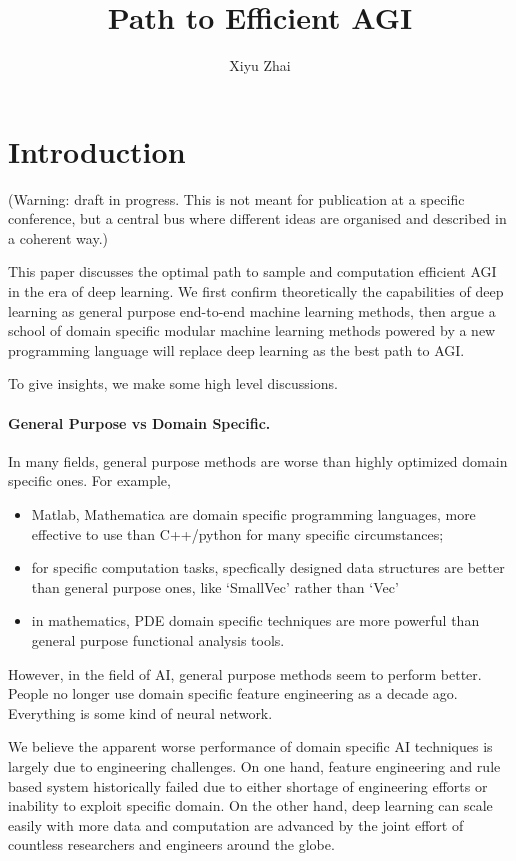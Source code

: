 \documentclass[11pt, oneside]{article}   	%
\title{Path to Efficient AGI}
\author{Xiyu Zhai}
\date{}							%
\theoremstyle{definition}
\begin{document}
\maketitle
\tableofcontents


\section{Introduction}

(Warning: draft in progress. This is not meant for publication at a specific conference, but a central bus where different ideas are organised and described in a coherent way.)

This paper discusses the optimal path to sample and computation efficient AGI in the era of deep learning. We first confirm theoretically the capabilities of deep learning as general purpose end-to-end machine learning methods, then argue a school of domain specific modular machine learning methods powered by a new programming language will replace deep learning as the best path to AGI.

To give insights, we make some high level discussions.

\paragraph {General Purpose vs Domain Specific.} In many fields, general purpose methods are worse than highly optimized domain specific ones. For example,
\begin{itemize}
	\item Matlab, Mathematica are domain specific programming languages, more effective to use than C++/python for many specific circumstances;
	\item for specific computation tasks, specfically designed data structures are better than general purpose ones, like `SmallVec' rather than `Vec'
	\item in mathematics, PDE domain specific techniques are more powerful than general purpose functional analysis tools.
\end{itemize}

However, in the field of AI, general purpose methods seem to perform better. People no longer use domain specific feature engineering as a decade ago. Everything is some kind of neural network.

We believe the apparent worse performance of domain specific AI techniques is largely due to engineering challenges. On one hand, feature engineering and rule based system historically failed due to either shortage of engineering efforts or inability to exploit specific domain. On the other hand, deep learning can scale easily with more data and computation are advanced by the joint effort of countless researchers and engineers around the globe.
\end{document}
